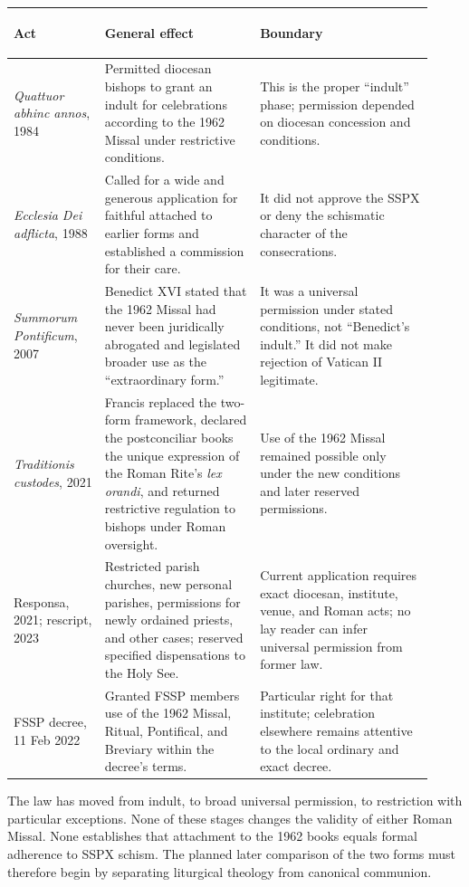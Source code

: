 \begin{longtable}{>{\bfseries\raggedright\arraybackslash}p{0.20\linewidth}>{\raggedright\arraybackslash}p{0.34\linewidth}>{\raggedright\arraybackslash}p{0.38\linewidth}}
\toprule
\textbf{Act} & \textbf{General effect} & \textbf{Boundary}\\
\midrule
\endhead
\emph{Quattuor abhinc annos}, 1984 & Permitted diocesan bishops to grant an indult for celebrations according to the 1962 Missal under restrictive conditions. & This is the proper “indult” phase; permission depended on diocesan concession and conditions.\\
\emph{Ecclesia Dei adflicta}, 1988 & Called for a wide and generous application for faithful attached to earlier forms and established a commission for their care. & It did not approve the SSPX or deny the schismatic character of the consecrations.\\
\emph{Summorum Pontificum}, 2007 & Benedict XVI stated that the 1962 Missal had never been juridically abrogated and legislated broader use as the “extraordinary form.” & It was a universal permission under stated conditions, not “Benedict's indult.” It did not make rejection of Vatican II legitimate.\\
\emph{Traditionis custodes}, 2021 & Francis replaced the two-form framework, declared the postconciliar books the unique expression of the Roman Rite's \emph{lex orandi}, and returned restrictive regulation to bishops under Roman oversight. & Use of the 1962 Missal remained possible only under the new conditions and later reserved permissions.\\
Responsa, 2021; rescript, 2023 & Restricted parish churches, new personal parishes, permissions for newly ordained priests, and other cases; reserved specified dispensations to the Holy See. & Current application requires exact diocesan, institute, venue, and Roman acts; no lay reader can infer universal permission from former law.\\
FSSP decree, 11 Feb 2022 & Granted FSSP members use of the 1962 Missal, Ritual, Pontifical, and Breviary within the decree's terms. & Particular right for that institute; celebration elsewhere remains attentive to the local ordinary and exact decree.\\
\bottomrule
\end{longtable}

The law has moved from indult, to broad universal permission, to restriction with particular exceptions. None of these stages changes the validity of either Roman Missal. None establishes that attachment to the 1962 books equals formal adherence to SSPX schism. The planned later comparison of the two forms must therefore begin by separating liturgical theology from canonical communion.

